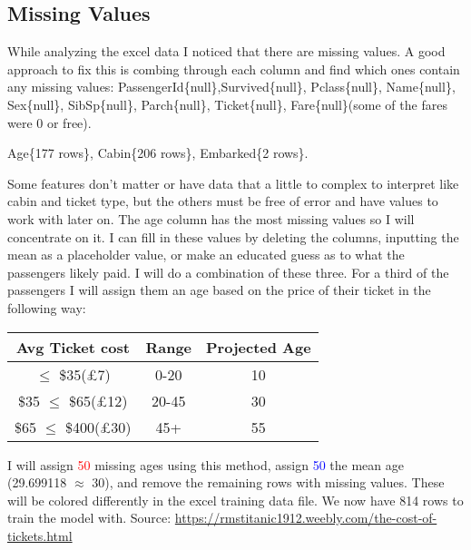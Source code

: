 \documentclass[notitlepage,a4paper,oneside,article,table]{article}
\begin{document}
\iffalse 
Use this comment to keep track of references and work specific to this section
https://www.obviously.ai/post/data-cleaning-in-machine-learning
https://www.analyticsvidhya.com/blog/2021/10/handling-missing-value/
https://towardsdatascience.com/7-ways-to-handle-missing-values-in-machine-learning-1a6326adf79e

\fi

   \subsection{Missing Values}
 While analyzing the excel data I noticed that there are missing values. A good approach to fix this is combing through each column and find which ones contain any missing values: PassengerId\{null\},Survived\{null\}, Pclass\{null\}, Name\{null\}, Sex\{null\}, SibSp\{null\}, Parch\{null\}, Ticket\{null\}, Fare\{null\}(some of the fares were 0 or free).
 
\begin{center}
    Age\{177 rows\}, Cabin\{206 rows\}, Embarked\{2 rows\}.
\end{center} 
 
 Some features don't matter or have data that a little to complex to interpret like cabin and ticket type, but the others must be free of error and have values to work with later on. The age column has the most missing values so I will concentrate on it. I can fill in these values by deleting the columns, inputting the mean as a placeholder value, or make an educated guess as to what the passengers likely paid. I will do a combination of these three. For a third of the passengers I will assign them an age based on the price of their ticket in the following way:


\begin{center}
\begin{tabular}{ |c|c|c| } 
 \hline
Avg Ticket cost & Range & Projected Age\\
 \hline
 $\leq$ \$35(£7) & 0-20 & 10 \\ 
  \hline
 \$35 $\leq$ \$65(£12) & 20-45 & 30 \\ 
  \hline
 \$65 $\leq$ \$400(£30)  & 45+ & 55 \\ 
 \hline
\end{tabular}
\end{center}

I will assign \textcolor{red}{50} missing ages using this method, assign \textcolor{blue}{50} the mean age (29.699118 $\approx$ 30), and remove the remaining rows with missing values. These will be colored differently in the excel training data file. We now have 814 rows to train the model with. Source: \url{https://rmstitanic1912.weebly.com/the-cost-of-tickets.html}
\end{document}
